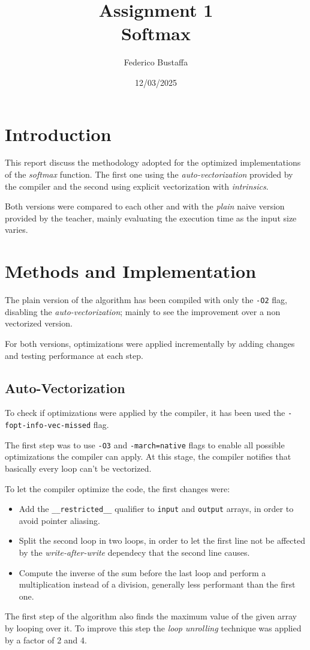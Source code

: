 \documentclass[12pt, a4paper]{article}
\title{Assignment 1\\Softmax}
\author{Federico Bustaffa}
\date{12/03/2025}
\begin{document}
\maketitle
\tableofcontents
\clearpage

\section{Introduction}

This report discuss the methodology adopted for the optimized implementations
of the \textit{softmax} function. The first one using the \textit{auto-vectorization}
provided by the compiler and the second using explicit vectorization with
\textit{intrinsics}.

Both versions were compared to each other and with the \textit{plain} naive
version provided by the teacher, mainly evaluating the execution time as the
input size varies.

\section{Methods and Implementation}

The plain version of the algorithm has been compiled with only the \verb|-O2|
flag, disabling the \textit{auto-vectorization}; mainly to see the improvement
over a non vectorized version.

For both versions, optimizations were applied incrementally by adding changes
and testing performance at each step.

\subsection{Auto-Vectorization}

To check if optimizations were applied by the compiler, it has been used the
\verb|-fopt-info-vec-missed| flag.

The first step was to use \verb|-O3| and \verb|-march=native| flags to enable
all possible optimizations the compiler can apply. At this stage, the compiler
notifies that basically every loop can't be vectorized.

To let the compiler optimize the code, the first changes were:
\begin{itemize}
	\item Add the \verb|__restricted__| qualifier to \verb|input| and
	      \verb|output| arrays, in order to avoid pointer aliasing.
	\item Split the second loop in two loops, in order to let the first line
	      not be affected by the \textit{write-after-write} dependecy that the
	      second line causes.
	\item Compute the inverse of the sum before the last loop and perform a
	      multiplication instead of a division, generally less performant than
	      the first one.
\end{itemize}
The first step of the algorithm also finds the maximum value of the given array
by looping over it. To improve this step the \textit{loop unrolling} technique
was applied by a factor of 2 and 4.
\end{document}
